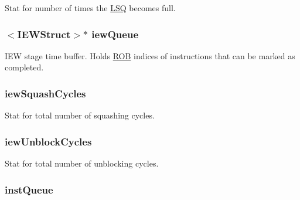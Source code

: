 \label{classDefaultIEW_a98fa20b7c9538614aaba18ecf7b96cf6}
Stat for number of times the \hyperlink{classLSQ}{LSQ} becomes full. \hypertarget{classDefaultIEW_a034b0868914c304e81c13c4e645d2616}{
\subsubsection[{iewQueue}]{$<${\bf IEWStruct}$>$$\ast$ {\bf iewQueue}}}
\label{classDefaultIEW_a034b0868914c304e81c13c4e645d2616}
IEW stage time buffer. Holds \hyperlink{classROB}{ROB} indices of instructions that can be marked as completed. \hypertarget{classDefaultIEW_acb215c0a56967a158558f7e8018cb68e}{
\subsubsection[{iewSquashCycles}]{ {\bf iewSquashCycles}}}
\label{classDefaultIEW_acb215c0a56967a158558f7e8018cb68e}
Stat for total number of squashing cycles. \hypertarget{classDefaultIEW_aa77818f080dcd03ea5f5f593768b1740}{
\subsubsection[{iewUnblockCycles}]{ {\bf iewUnblockCycles}}}
\label{classDefaultIEW_aa77818f080dcd03ea5f5f593768b1740}
Stat for total number of unblocking cycles. \hypertarget{classDefaultIEW_a190caab0d0faf2269b72f46da4bac40f}{
\subsubsection[{instQueue}]{ {\bf instQueue}}}
\label{classDefaultIEW_a190caab0d0faf2269b72f46da4bac40f}

